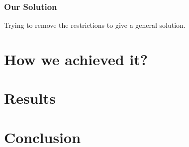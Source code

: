 \documentclass{beamer}
\begin{document}
\begin{frame}
	\frametitle{Our Solution}
	Trying to remove the restrictions to give a general solution.
\end{frame}


\section{How we achieved it?} %

\begin{frame}
	\frametitle{}
	
\end{frame}


\section{Results} %

\begin{frame}
	\frametitle{}
	
\end{frame}


\section{Conclusion} %

\begin{frame}
	\frametitle{}
	
\end{frame}
\end{document}
